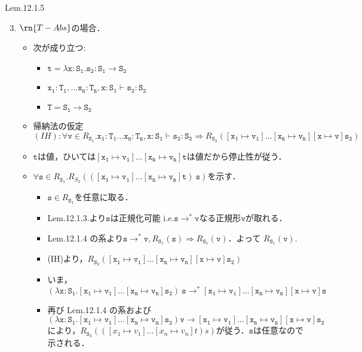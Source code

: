 \documentclass[9pt]{beamer}
\begin{document}
\begin{frame}{Lem.12.1.5}
\begin{enumerate}\setcounter{enumi}{2}
        \item $\rn{T-Abs}$の場合．\begin{itemize}
\item 次が成り立つ:\begin{itemize}
\item $\mathtt{t = \lambda x:S_{1}.s_{2}:S_{1}\to S_{2}}$
\item $\mathtt{x_{1}:T_{1},\ldots x_{n}:T_{n}, x:S_{1}\vdash s_{2}:S_{2}}$
\item $\mathtt{T = S_{1}\to S_{2}}$
\end{itemize}
\item 帰納法の仮定$(IH): \forall\mathtt{v}\in R_{\mathtt{S_{1}}}. \mathtt{x_{1}:T_{1}\ldots x_{n}:T_{n}, x:S_{1}\vdash s_{2}:S_{2}}\Rightarrow R_{\mathtt{S_{2}}}(\mathtt{[x_{1}\mapsto v_{1}]\ldots[x_{n}\mapsto v_{n}][x\mapsto v]s_{2}})$
\item $\mathtt{t}$は値，ひいては$\mathtt{[x_{1}\mapsto v_{1}]\ldots [x_{n}\mapsto v_{n}]t}$は値だから停止性が従う．
\item $\forall \mathtt{s}\in R_{\mathtt{S_{1}}}.R_{S_{2}}(\mathtt{([x_{1}\mapsto v_{1}]\ldots[x_{n}\mapsto v_{n}]t)\ s})$を示す．\begin{itemize}
\item $\mathtt{s}\in R_{\mathtt{S_{1}}}$を任意に取る．
\item Lem.12.1.3.より$\mathtt{s}$は正規化可能 i.e.$\mathtt{s\longrightarrow^{*}v}$なる正規形$\mathtt{v}$が取れる．
\item Lem.12.1.4 の系より$\mathtt{s\longrightarrow^{*}v}, R_{\mathtt{S_{1}}}(\mathtt{s})\Rightarrow R_{\mathtt{S_{1}}}(\mathtt{v})$．よって
$R_{\mathtt{S_{1}}}(\mathtt{v})$.
\item (IH)より，$R_{\mathtt{S_{2}}}(\mathtt{[x_{1}\mapsto v_{1}]\ldots[x_{n}\mapsto v_{n}][x\mapsto v]s_{2}})$
\item いま，$\mathtt{(\lambda x:S_{1}.[x_{1}\mapsto v_{1}]\ldots[x_{n}\mapsto v_{n}]s_{2})\ s\longrightarrow^{*}[x_{1}\mapsto v_{1}]\ldots[x_{n}\mapsto v_{n}][x\mapsto v] s}$
\item 再び Lem.12.1.4 の系および$\mathtt{(\lambda x:S_{1}.[x_{1}\mapsto v_{1}]\ldots[x_{n}\mapsto v_{n}]s_{2})v\longrightarrow [x_{1}\mapsto v_{1}]\ldots[x_{n}\mapsto v_{n}][x\mapsto v]s_{2}}$により，$R_{\mathtt{S_{2}}}(([x_{1}\mapsto v_{1}]\ldots[x_{n}\mapsto v_{n}]t) s)$が従う．$\mathtt{s}$は任意なので示される．
\end{itemize}
\end{itemize}
\end{enumerate}
\end{frame}
\end{document}
